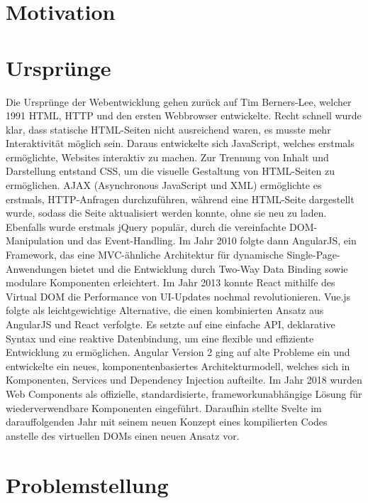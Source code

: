 \documentclass[oneside]{ausarbeitung}
\begin{document}
\section{Motivation}
\label{sec:motivation}


\section{Ursprünge}
\label{sec:ursprünge}

Die Ursprünge der Webentwicklung gehen zurück auf Tim Berners-Lee, welcher 1991 HTML, HTTP und den ersten Webbrowser entwickelte.
Recht schnell wurde klar, dass statische HTML-Seiten nicht ausreichend waren, es musste mehr Interaktivität möglich sein. Daraus entwickelte sich JavaScript, welches erstmals ermöglichte, Websites interaktiv zu machen.
Zur Trennung von Inhalt und Darstellung entstand CSS, um die visuelle Gestaltung von HTML-Seiten zu ermöglichen.
AJAX (Asynchronous JavaScript und XML) ermöglichte es erstmals, HTTP-Anfragen durchzuführen, während eine HTML-Seite dargestellt wurde, sodass die Seite aktualisiert werden konnte, ohne sie neu zu laden.
Ebenfalls wurde erstmals jQuery populär, durch die vereinfachte DOM-Manipulation und das Event-Handling.
Im Jahr 2010 folgte dann AngularJS, ein Framework, das eine MVC-ähnliche Architektur für dynamische Single-Page-Anwendungen bietet und die Entwicklung durch Two-Way Data Binding sowie modulare Komponenten erleichtert.
Im Jahr 2013 konnte React mithilfe des Virtual DOM die Performance von UI-Updates nochmal revolutionieren.
Vue.js folgte als leichtgewichtige Alternative, die einen kombinierten Ansatz aus AngularJS und React verfolgte. Es setzte auf eine einfache API, deklarative Syntax und eine reaktive Datenbindung, um eine flexible und effiziente Entwicklung zu ermöglichen.
Angular Version 2 ging auf alte Probleme ein und entwickelte ein neues, komponentenbasiertes Architekturmodell, welches sich in Komponenten, Services und Dependency Injection aufteilte. 
Im Jahr 2018 wurden Web Components als offizielle, standardisierte, frameworkunabhängige Lösung für wiederverwendbare Komponenten eingeführt.
Daraufhin stellte Svelte im darauffolgenden Jahr mit seinem neuen Konzept eines kompilierten Codes anstelle des virtuellen DOMs einen neuen Ansatz vor.

\section{Problemstellung}
\label{sec:problemstellung}
\end{document}
